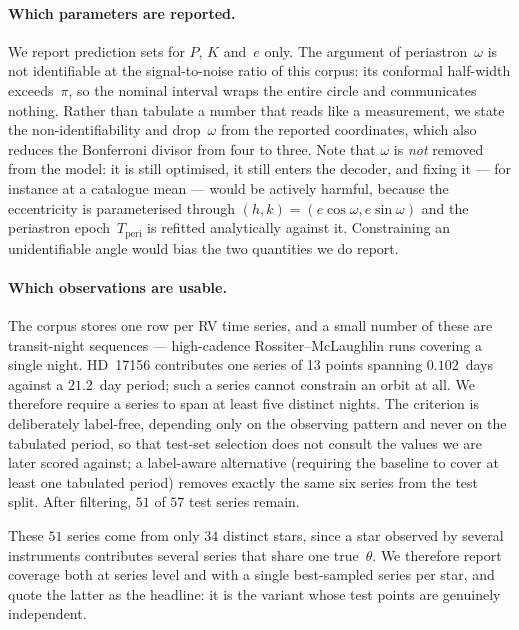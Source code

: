 \paragraph{Which parameters are reported.}
We report prediction sets for $P$, $K$ and~$e$ only.  The argument of
periastron~$\omega$ is not identifiable at the signal-to-noise ratio of this
corpus: its conformal half-width exceeds~$\pi$, so the nominal interval wraps
the entire circle and communicates nothing.  Rather than tabulate a number that
reads like a measurement, we state the non-identifiability and drop~$\omega$
from the reported coordinates, which also reduces the Bonferroni divisor from
four to three.  Note that $\omega$ is \emph{not} removed from the model: it is
still optimised, it still enters the decoder, and fixing it --- for instance at
a catalogue mean --- would be actively harmful, because the eccentricity is
parameterised through $(h,k) = (e\cos\omega, e\sin\omega)$ and the periastron
epoch~$T_{\mathrm{peri}}$ is refitted analytically against it.  Constraining an
unidentifiable angle would bias the two quantities we do report.

\paragraph{Which observations are usable.}
The corpus stores one row per RV time series, and a small number of these are
transit-night sequences --- high-cadence Rossiter--McLaughlin runs covering a
single night.  HD~17156 contributes one series of 13 points spanning
$0.102$~days against a $21.2$~day period; such a series cannot constrain an
orbit at all.  We therefore require a series to span at least five distinct
nights.  The criterion is deliberately label-free, depending only on the
observing pattern and never on the tabulated period, so that test-set selection
does not consult the values we are later scored against; a label-aware
alternative (requiring the baseline to cover at least one tabulated period)
removes exactly the same six series from the test split.  After filtering,
$51$ of $57$ test series remain.

These $51$ series come from only $34$ distinct stars, since a star observed by
several instruments contributes several series that share one true~$\theta$.
We therefore report coverage both at series level and with a single
best-sampled series per star, and quote the latter as the headline: it is the
variant whose test points are genuinely independent.

